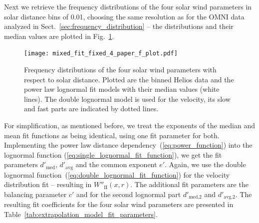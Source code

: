 \documentclass[]{aa}
\begin{document}
        Next we retrieve the frequency distributions of the four solar wind parameters in solar distance bins of \SI{0.01}{\au}, choosing the same resolution as for the OMNI data analyzed in Sect.~\ref{sec:frequency_distribution} -- the distributions and their median values are plotted in Fig.~\ref{fig:mixed_fit_fixed_4_paper_f_plot}.
        \begin{figure}
                \texttt{[image: mixed\_fit\_fixed\_4\_paper\_f\_plot.pdf]}
                \caption{Frequency distributions of the four solar wind parameters with respect to solar distance. Plotted are the binned Helios data and the power law lognormal fit models with their median values (white lines). The double lognormal model is used for the velocity, its slow and fast parts are indicated by dotted lines.}
                \label{fig:mixed_fit_fixed_4_paper_f_plot}
        \end{figure}
        For simplification, as mentioned before, we treat the exponents of the median and mean fit functions as being identical, using one fit parameter for both. Implementing the power law distance dependency~(\ref{eq:power_function}) into the lognormal function (\ref{eq:single_lognormal_fit_function}), we get the fit parameters $d'_\text{med}$, $d'_\text{avg}$ and the common exponent $e'$. Again, we use the double lognormal function~(\ref{eq:double_lognormal_fit_function}) for the velocity distribution fit -- resulting in $W''_\text{II}(x,r)$. The additional fit parameters are the balancing parameter $c'$ and for the second lognormal part $d'_\text{med,2}$ and $d'_\text{avg,2}$. The resulting fit coefficients for the four solar wind parameters are presented in Table~\ref{tab:extrapolation_model_fit_parameters}.
\end{document}
